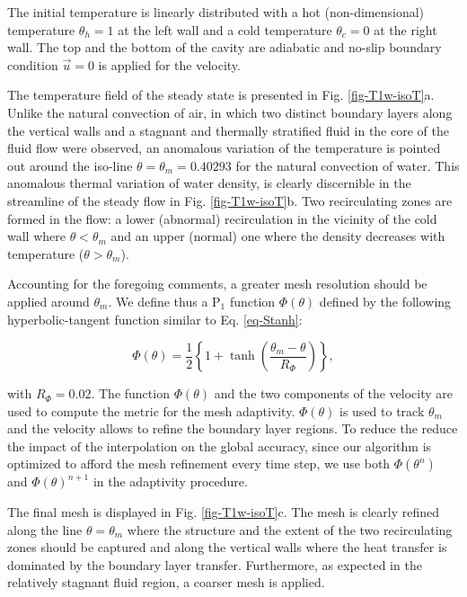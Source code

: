 \noindent The initial temperature is linearly distributed with a hot (non-dimensional) temperature $\theta_h =1$ at the left wall and a cold temperature $\theta_c=0$ at the right wall. %
The top and the bottom of the cavity are adiabatic and no-slip boundary condition $\vec u = 0$ is applied for the velocity.

The temperature field of the steady state is presented in Fig. \ref{fig-T1w-isoT}a.
Unlike the natural convection of air, in which two distinct boundary layers along the vertical walls and a stagnant and thermally stratified fluid in the core of the fluid flow were observed, an anomalous variation of the temperature is pointed out around the iso-line $\theta = \theta_m = 0.40293$ for the natural convection of water.
This anomalous thermal variation of water density, is clearly discernible in the streamline of the steady flow in Fig. \ref{fig-T1w-isoT}b.
Two recirculating zones are formed in the flow: a lower (abnormal) recirculation  in the vicinity of the cold wall where $\theta<\theta_m$ and an upper (normal) one where the density decreases with temperature ($\theta>\theta_m$).

Accounting for the foregoing comments, a greater mesh resolution should be applied around $\theta_m$.
We define thus a P$_1$ function $\Phi(\theta)$ defined by the following hyperbolic-tangent function similar to Eq. \ref{eq-Stanh}:

\begin{equation}
\Phi(\theta) =  \frac{1}{2}\left\{
1 + \tanh\left(\frac{\theta_m-\theta}{R_{\Phi}}\right)
\right\},
\label{eq-Stm}
\end{equation} 

\noindent with $R_{\Phi}=0.02$. 
The function $\Phi(\theta)$ and the two components of the velocity are used to compute the metric for the mesh adaptivity.
$\Phi(\theta)$ is used to track $\theta_m$ and the velocity allows to refine the boundary layer regions.
To reduce the reduce the impact of the interpolation on the global accuracy, since our algorithm is optimized to afford the mesh refinement every time step, we use both $\Phi(\theta^n)$ and $\Phi(\theta)^{n+1}$ in the adaptivity procedure.

\noindent The final mesh is displayed in Fig. \ref{fig-T1w-isoT}c.
The mesh is clearly refined along the line $\theta = \theta_m$ where  the structure and the extent of the two recirculating zones should be captured and along the vertical walls where the heat transfer is dominated by the boundary layer transfer.
Furthermore, as expected in the relatively stagnant fluid region, a coarser mesh is applied.

